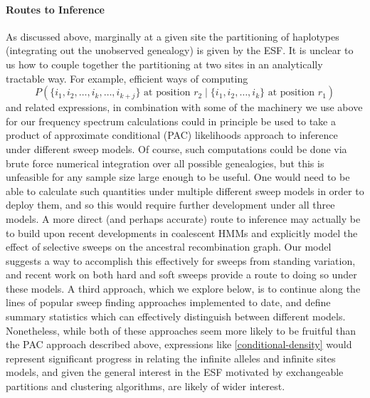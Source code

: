 \documentclass[a4paper,10pt]{article}
\begin{document}
\paragraph{Routes to Inference}
As discussed above, marginally at a given site the partitioning of haplotypes (integrating out the unobserved genealogy) is given by the ESF. It is unclear to us how to couple together the partitioning at two sites in an analytically tractable way. For example, efficient ways of computing 
\begin{equation}
	P\left(\{i_1,i_2,\dots,i_k,\dots,i_{k+j}\} \text{ at position } r_2 \mid \{i_1,i_2,\dots,i_k\} \text{ at position } r_1 \right) \label{conditional-density}
\end{equation}
and related expressions, in combination with some of the machinery we use above for our frequency spectrum calculations could in principle be used to take a product of approximate conditional (PAC) likelihoods approach to inference under different sweep models. Of course, such computations could be done via brute force numerical integration over all possible genealogies, but this is unfeasible for any sample size large enough to be useful. One would need to be able to calculate such quantities under multiple different sweep models in order to deploy them, and so this would require further development under all three models. A more direct (and perhaps accurate) route to inference may actually be to build upon recent developments in coalescent HMMs \citep{Li2011,Paul:2011gv,Sheehan:2013ib,Rasmussen:2014gj} and explicitly model the effect of selective sweeps on the ancestral recombination graph. Our model suggests a way to accomplish this effectively for sweeps from standing variation, and recent work on both hard and soft sweeps \citep{Barton1998,Durrett:2004fl,Durrett:2005fr,Schweinsberg:2005eh,Etheridge:2006fk,Hermisson2008,Messer:2012ie} provide a route to doing so under these models. A third approach, which we explore below, is to continue along the lines of popular sweep finding approaches implemented to date, and define summary statistics which can effectively distinguish between different models. Nonetheless, while both of these approaches seem more likely to be fruitful than the PAC approach described above, expressions like \eqref{conditional-density} would represent significant progress in relating the infinite alleles and infinite sites models, and given the general interest in the ESF motivated by exchangeable partitions and clustering algorithms, are likely of wider interest.
 
\end{document}
